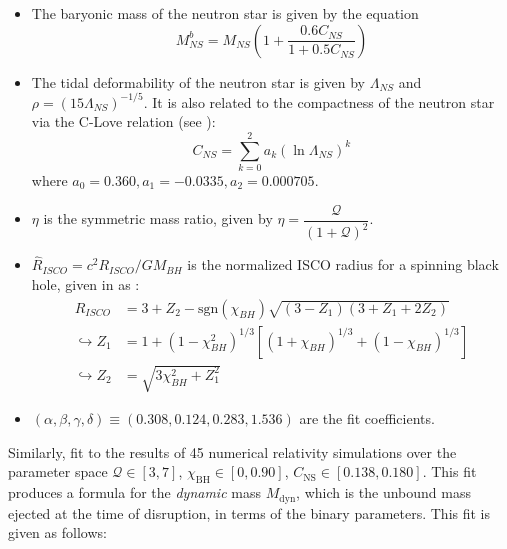    \begin{itemize}

        \item The baryonic mass of the neutron star is given by the equation $$M_{NS}^b
            = M_{NS} \left(1 + \dfrac{0.6 C_{NS}}{1 + 0.5 C_{NS}} \right)$$

        \item The tidal deformability of the neutron star is given by $\Lambda_{NS}$ and
            $\rho = (15 \Lambda_{NS})^{-1/5}$. It is also related to the compactness of
            the neutron star via the C-Love relation (see \cite{yagi_2017}):
            \begin{equation}
                C_{NS} = \sum_{k=0}^{2} a_k (\ln \Lambda_{NS})^k
            \end{equation}
            where $a_0 = 0.360, a_1 = -0.0335, a_2 = 0.000705$.

        \item $\eta$ is the symmetric mass ratio, given by $ \eta =
            \dfrac{\mathcal{Q}}{(1 + \mathcal{Q})^2} $.

        \item $\hat{R}_{ISCO} = c^2 R_{ISCO} / GM_{BH}$ is the normalized ISCO radius
            for a spinning black hole, given in \cite{bardeen_1972} as :
            \begin{align}
                \hat{R}_{ISCO} &=
                    3 +
                    Z_2 -
                    \mathrm{sgn}(\chi_{BH}) \sqrt{(3 - Z_1)(3+Z_1 + 2Z_2)} \\
                \hookrightarrow Z_1 &=
                                1 +
                                (1 - \chi_{BH}^2)^{1/3}
                                [
                                    (1 + \chi_{BH})^{1/3} + (1 - \chi_{BH})^{1/3}
                                ] \nonumber \\
                \hookrightarrow Z_2 &=
                                \sqrt{3\chi_{BH}^2 +  Z_1^2} \nonumber
            \end{align}

        \item $(\alpha, \beta, \gamma, \delta) \equiv (0.308, 0.124, 0.283, 1.536)$ are
            the fit coefficients.

    \end{itemize}

    Similarly, \cite{kawaguchi_2016} fit to the results of 45 numerical relativity
    simulations over the parameter space $\mathcal{Q} \in [3,7]$, $\chi_{\mathrm{BH}}
    \in [0, 0.90]$, $C_{\mathrm{NS}} \in [0.138, 0.180]$. This fit produces a formula
    for the \textit{dynamic} mass $M_{\mathrm{dyn}}$, which is the unbound mass ejected
    at the time of disruption, in terms of the binary parameters. This fit is given as
    follows:

